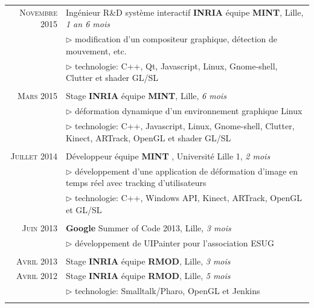 \documentclass[9pt]{article}
\begin{document}
\begin{tabular}{rl}
	\textsc{Novembre } 2015& Ingénieur R\&D système interactif \textbf{INRIA} équipe \textbf{MINT}, {\small Lille, \textit{1 an 6 mois}}\\
        &{$\rhd$ \small modification d'un compositeur graphique, détection de mouvement, etc.}\\	
        &{$\rhd$ \small technologie: C++, Qt, Javascript, Linux, Gnome-shell, Clutter et shader GL/SL}\\ &\\
       
	\textsc{Mars} 2015& Stage \textbf{INRIA} équipe \textbf{MINT}, {\small Lille, \textit{6 mois}}\\
        &{$\rhd$ \small  déformation dynamique d'un environnement graphique Linux}\\
        &{$\rhd$ \small technologie: C++, Javascript, Linux, Gnome-shell, Clutter, Kinect, ARTrack, OpenGL et shader GL/SL}\\ &\\
       
	\textsc{Juillet} 2014& Développeur équipe \textbf{MINT} , {\small Université Lille 1, \textit{2 mois}}\\
        &{$\rhd$ \small développement d'une application de déformation d'image en temps réel avec tracking d'utilisateurs}\\
        &{$\rhd$ \small technologie: C++, Windows API, Kinect, ARTrack, OpenGL et GL/SL}\\ &\\
        
	\textsc{Juin} 2013& \textbf{Google} Summer of Code 2013, {\small Lille, \textit{3 mois}}\\
        &{$\rhd$ \small développement de UIPainter pour l'association ESUG}\\ &\\
        
	\textsc{Avril} 2013& Stage \textbf{INRIA} équipe \textbf{RMOD}, {\small Lille, \textit{3 mois}}\\
	\textsc{Avril} 2012& Stage \textbf{INRIA} équipe \textbf{RMOD}, {\small Lille, \textit{5 mois}}\\
        &{$\rhd$ \small technologie: Smalltalk/Pharo, OpenGL et Jenkins}\\ &\\
\end{tabular}
\newpage
%
%
\end{document}
